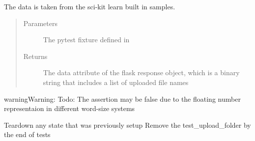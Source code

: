 \documentclass[letterpaper,10pt,english]{sphinxmanual}
\begin{document}
\begin{fulllineitems}
\begin{fulllineitems}
The data is taken from the sci-kit learn built in samples.
\begin{quote}\begin{description}
\item[{Parameters}] \leavevmode
{} \textendash{} The pytest fixture defined in {\hyperref[\detokenize{tests:module-tests.conftest}]{}}

\item[{Returns}] \leavevmode
The data attribute of the flask response object, which is a binary string that includes a list of uploaded
file names

\end{description}\end{quote}

\begin{sphinxadmonition}{warning}{Warning:}
Todo: The assertion may be false due to the floating number representaion in different word-size systems
\end{sphinxadmonition}

\end{fulllineitems}


\end{fulllineitems}


\begin{fulllineitems}
\label{\detokenize{tests:tests.test_cloudmesh.teardown_module}}
Teardown any state that was previously setup
Remove the test\_upload\_folder by the end of tests

\end{fulllineitems}


\begin{fulllineitems}
\label{\detokenize{tests:tests.test_cloudmesh.test_run_pca}}
\end{fulllineitems}
\end{document}
